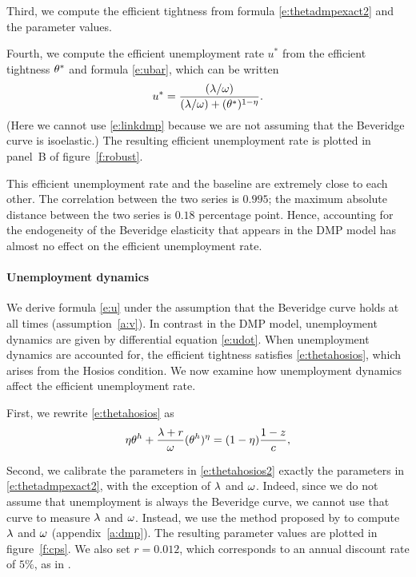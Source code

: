 \documentclass[letterpaper,12pt,leqno]{article}
\begin{document}
Third, we compute the efficient tightness from formula \eqref{e:thetadmpexact2} and the parameter values. 

Fourth, we compute the efficient unemployment rate $u^*$ from the efficient tightness $\theta^*$ and formula \eqref{e:ubar}, which can be written 
\begin{equation}
u^* = \frac{(\lambda/\omega)}{(\lambda/\omega)+(\theta^*)^{1-\eta}}.
\label{e:ub2}\end{equation}
(Here we cannot use \eqref{e:linkdmp} because we are not assuming that the Beveridge curve is isoelastic.) The resulting efficient unemployment rate is plotted in panel~B of figure~\ref{f:robust}.

This efficient unemployment rate and the baseline are extremely close to each other. The correlation between the two series is $0.995$; the maximum absolute distance between the two series is $0.18$ percentage point. Hence, accounting for the endogeneity of the Beveridge elasticity that appears in the DMP model has almost no effect on the efficient unemployment rate.

\paragraph{Unemployment dynamics} We derive formula \eqref{e:u} under the assumption that the Beveridge curve holds at all times (assumption~\ref{a:v}). In contrast in the DMP model, unemployment dynamics are given by differential equation \eqref{e:udot}. When unemployment dynamics are accounted for, the efficient tightness satisfies \eqref{e:thetahosios}, which arises from the Hosios condition. We now examine how unemployment dynamics affect the efficient unemployment rate. 

First, we rewrite \eqref{e:thetahosios} as
\begin{equation}
\eta\theta^h + \frac{\lambda + r}{\omega} (\theta^h)^{\eta} = (1-\eta) \frac{1-z}{c},
\label{e:thetahosios2}\end{equation}

Second, we calibrate the parameters in \eqref{e:thetahosios2} exactly the parameters in \eqref{e:thetadmpexact2}, with the exception of $\lambda$ and $\omega$. Indeed, since we do not assume that unemployment is always the Beveridge curve, we cannot use that curve to measure $\lambda$ and $\omega$. Instead, we use the method proposed by  to compute $\lambda$ and $\omega$ (appendix~\ref{a:dmp}). The resulting parameter values are plotted in figure~\ref{f:cps}. We also set $r = 0.012$, which corresponds to an annual discount rate of $5\%$, as in .
\end{document}
